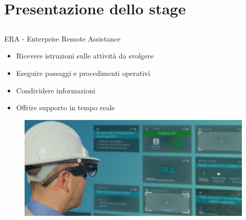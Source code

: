 \section{Presentazione dello stage}
	\subsection{}
		\begin{frame}{ERA - Enterprise Remote Assistance}
			\begin{minipage}{\textwidth}
				\begin{minipage}{0.60\textwidth}
					\begin{itemize}
						\item Ricevere istruzioni sulle attività da svolgere
						\item Eseguire passaggi e procedimenti operativi
						\item Condividere informazioni
						\item Offrire supporto in tempo reale
					\end{itemize}
				\end{minipage}
				\begin{minipage}{0.30\textwidth}
					\begin{figure}
						\includegraphics[width=1.5\textwidth]{capitolo_2/immagini/era.png}
					\end{figure}
				\end{minipage}
			\end{minipage}
		\end{frame}
